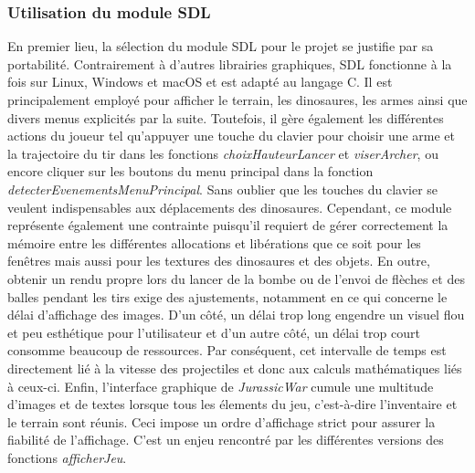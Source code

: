 \documentclass[11pt,a4paper]{article}
\begin{document}
\subsubsection{Utilisation du module SDL}
En premier lieu, la sélection du module SDL pour le projet se justifie par sa portabilité. Contrairement à d'autres librairies graphiques, SDL fonctionne à la fois sur Linux, Windows et macOS et est adapté au langage C. Il est principalement employé pour afficher le terrain, les dinosaures, les armes ainsi que divers menus explicités par la suite. Toutefois, il gère également les différentes actions du joueur tel qu'appuyer une touche du clavier pour choisir une arme et la trajectoire du tir dans les fonctions \textit{\mbox{choixHauteurLancer}} et \textit{\mbox{viserArcher}}, ou encore cliquer sur les boutons du menu principal dans la fonction \textit{\mbox{detecterEvenementsMenuPrincipal}}. Sans oublier que les touches du clavier se veulent indispensables aux déplacements des dinosaures. Cependant, ce module représente également une contrainte puisqu'il requiert de gérer correctement la mémoire entre les différentes allocations et libérations que ce soit pour les fenêtres mais aussi pour les textures des dinosaures et des objets. En outre, obtenir un rendu propre lors du lancer de la bombe ou de l'envoi de flèches et des balles pendant les tirs exige des ajustements, notamment en ce qui concerne le délai d'affichage des images. D'un côté, un délai trop long engendre un visuel flou et peu esthétique pour l'utilisateur et d'un autre côté, un délai trop court consomme beaucoup de ressources. Par conséquent, cet intervalle de temps est directement lié à la vitesse des projectiles et donc aux calculs mathématiques liés à ceux-ci. Enfin, l'interface graphique de \textit{\mbox{JurassicWar}} cumule une multitude d'images et de textes lorsque tous les élements du jeu, c'est-à-dire l'inventaire et le terrain sont réunis. Ceci impose un ordre d'affichage strict pour assurer la fiabilité de l'affichage. C'est un enjeu rencontré par les différentes versions des fonctions \textit{\mbox{afficherJeu}}.
 
\end{document}
